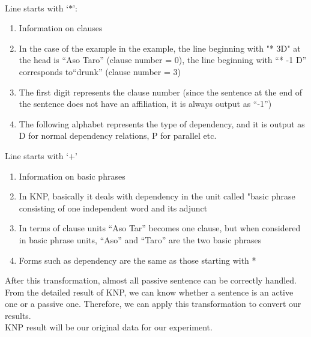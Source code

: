 \\
Line starts with `$*$':
\begin{enumerate}
\item Information on clauses
\item In the case of the example in the example, the line beginning with "* 3D" at the head is ``Aso Taro'' (clause number = 0), the line beginning with ``* -1 D'' corresponds to``drunk'' (clause number = 3) 
\item The first digit represents the clause number (since the sentence at the end of the sentence does not have an affiliation, it is always output as ``-1'')
\item The following alphabet represents the type of dependency, and it is output as D for normal dependency relations, P for parallel etc.
\end{enumerate}
Line starts with `$+$'
\begin{enumerate}
\item Information on basic phrases
\item In KNP, basically it deals with dependency in the unit called "basic phrase consisting of one independent word and its adjunct
\item In terms of clause units ``Aso Tar'' becomes one clause, but when considered in basic phrase units, ``Aso'' and ``Taro'' are the two basic phrases
\item Forms such as dependency are the same as those starting with *
\end{enumerate}
After this transformation, almost all passive sentence can be correctly handled. From the detailed result of KNP, we can know whether a sentence is an active one or a passive one. Therefore, we can apply this transformation to convert our results.\\
KNP result will be our original data for our experiment.